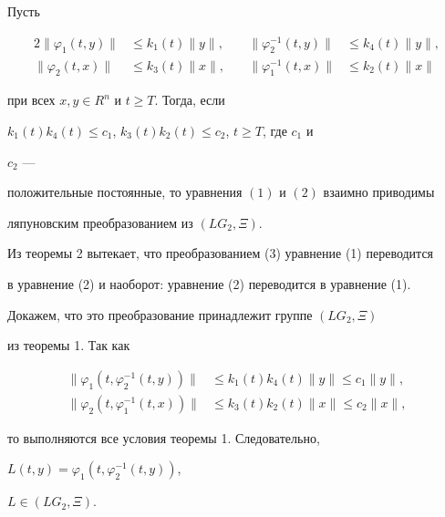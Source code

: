  


\begin{thm} 


Пусть 


\begin{alignat*}{2} 


\|\varphi_1(t,y)\|&\le k_1(t)\|y\|, &\quad 


\|\varphi^{-1}_2(t,y)\|&\le k_4(t)\|y\|,\\ 


\|\varphi_2(t,x)\|&\le k_3(t)\|x\|, &\quad 


\|\varphi^{-1}_1(t,x)\|&\le k_2(t)\|x\| 


\end{alignat*} 


при всех $x,y\in R^n$ и $t\ge T$. Тогда, если


$k_1(t)k_4(t)\le c_1$, $k_3(t)k_2(t)\le c_2$, $t\ge T$, где $c_1$ и 


$c_2$ --- 


положительные постоянные, то уравнения $(1)$ и $(2)$ взаимно приводимы 


ляпуновским преобразованием из $(LG_2,\Xi)$. 


\end{thm} 


 


\begin{pf} 


Из теоремы 2 вытекает, что преобразованием (3) уравнение (1) переводится 


в уравнение (2) и наоборот: уравнение (2) переводится в уравнение (1). 


Докажем, что это преобразование принадлежит группе $(LG_2,\Xi)$ 


из теоремы 1. Так как 


\begin{align*} 


\|\varphi_1(t,\varphi^{-1}_2(t,y))\|&\le k_1(t)k_4(t)\|y\|\le 


c_1\|y\|, \\ 


\|\varphi_2(t,\varphi^{-1}_1(t,x))\|&\le k_3(t)k_2(t)\|x\|\le 


c_2\|x\|, 


\end{align*} 


то выполняются все условия теоремы 1. Следовательно, 


$L(t,y)=\varphi_1(t,\varphi^{-1}_2(t,y))$, 


$L\in(LG_2,\Xi)$. 


\end{pf} 


